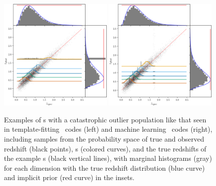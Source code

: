 \begin{figure}
	\includegraphics[width=0.49\textwidth]{figures/chippr/thesis_eout_mega_scatter.png}
	\includegraphics[width=0.49\textwidth]{figures/chippr/thesis_rout_mega_scatter.png}
	\caption{
		Examples of \pzpdf s with a catastrophic outlier population like that seen in template-fitting \pzpdf\ codes (left) and machine learning \pzpdf\ codes (right), including samples from the probability space of true and observed redshift (black points), \pzpdf s (colored curves), and the true redshifts of the example \pzpdf s (black vertical lines), with marginal histograms (gray) for each dimension with the true redshift distribution (blue curve) and implicit prior (red curve) in the insets.
	}
\end{figure}

